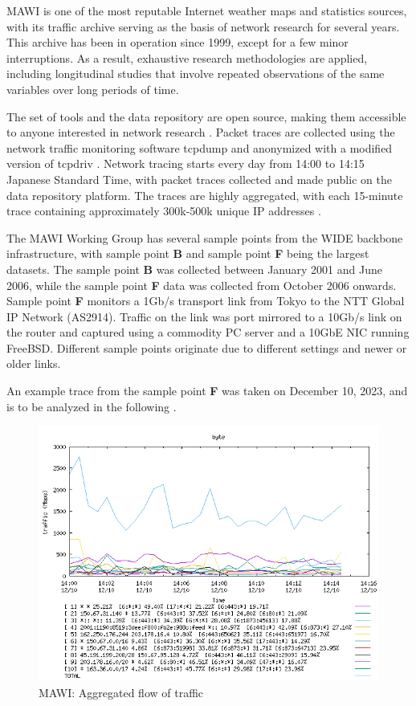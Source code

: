 \documentclass[sigconf,authorversion,nonacm]{acmart}
\begin{document}
MAWI is one of the most reputable Internet weather maps and statistics sources, with its traffic archive serving as the basis of network research for several years. This archive has been in operation since 1999, except for a few minor interruptions. As a result, exhaustive research methodologies are applied, including longitudinal studies that involve repeated observations of the same variables over long periods of time.

The set of tools and the data repository are open source, making them accessible to anyone interested in network research \cite{MAWIDataset}. Packet traces are collected using the network traffic monitoring software tcpdump \cite{tcpdump} and anonymized with a modified version of tcpdriv \cite{TCPDPRIV}. Network tracing starts every day from 14:00 to 14:15 Japanese Standard Time, with packet traces collected and made public on the data repository platform. The traces are highly aggregated, with each 15-minute trace containing approximately 300k-500k unique IP addresses \cite{5061979}.

The MAWI Working Group has several sample points from the WIDE backbone infrastructure, with sample point \textbf{B} and sample point \textbf{F} being the largest datasets. The sample point \textbf{B} was collected between January 2001 and June 2006, while the sample point \textbf{F} data was collected from October 2006 onwards. Sample point \textbf{F} monitors a 1Gb/s transport link from Tokyo to the NTT Global IP Network (AS2914). Traffic on the link was port mirrored to a 10Gb/s link on the router and captured using a commodity PC server and a 10GbE NIC running FreeBSD. Different sample points originate due to different settings and newer or older links.

An example trace from the sample point \textbf{F} was taken on December 10, 2023, and is to be analyzed in the following \cite{traceMAWI}.

\begin{figure}
        \centering
        \includegraphics[width=1\linewidth]{MAWI/MAWI 2023-12-10 aggregated analysis byte.png}
        \caption{MAWI: Aggregated flow of traffic}
        \label{MAWI: Aggregated Flow Byte}
\end{figure}
\end{document}

